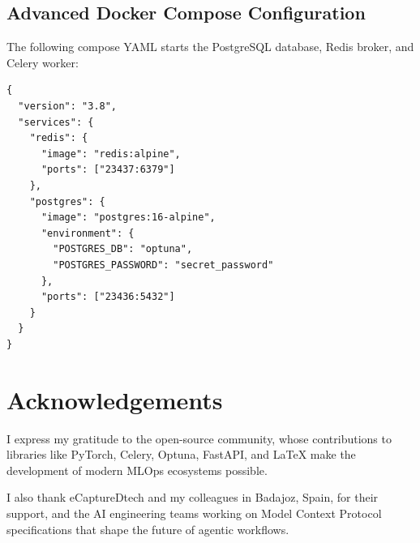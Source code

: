 \documentclass[12pt,a4paper]{report}
\begin{document}
\cleardoublepage
\begin{appendices}
\chapter{Advanced Docker Compose Configuration}
The following compose YAML starts the PostgreSQL database, Redis broker, and Celery worker:

\begin{lstlisting}[caption={Docker Compose configuration file}]
{
  "version": "3.8",
  "services": {
    "redis": {
      "image": "redis:alpine",
      "ports": ["23437:6379"]
    },
    "postgres": {
      "image": "postgres:16-alpine",
      "environment": {
        "POSTGRES_DB": "optuna",
        "POSTGRES_PASSWORD": "secret_password"
      },
      "ports": ["23436:5432"]
    }
  }
}
\end{lstlisting}
\end{appendices}

\cleardoublepage
\chapter*{Acknowledgements}
I express my gratitude to the open-source community, whose contributions to libraries like PyTorch, Celery, Optuna, FastAPI, and LaTeX make the development of modern MLOps ecosystems possible. 

I also thank eCaptureDtech and my colleagues in Badajoz, Spain, for their support, and the AI engineering teams working on Model Context Protocol specifications that shape the future of agentic workflows.
\end{document}
